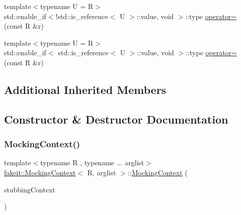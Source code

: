 \begin{DoxyCompactItemize}
\item 
{\footnotesize template$<$typename U  = R$>$ }\\std\+::enable\+\_\+if$<$!std\+::is\+\_\+reference$<$ U $>$\+::value, void $>$\+::type \mbox{\hyperlink{classfakeit_1_1MockingContext_adfac3df2408adaa86efec81bd5533a6d}{operator=}} (const R \&r)
\item 
{\footnotesize template$<$typename U  = R$>$ }\\std\+::enable\+\_\+if$<$ std\+::is\+\_\+reference$<$ U $>$\+::value, void $>$\+::type \mbox{\hyperlink{classfakeit_1_1MockingContext_ad5e903b223858dbe67f1da1523ef0d60}{operator=}} (const R \&r)
\end{DoxyCompactItemize}
\subsection*{Additional Inherited Members}


\subsection{Constructor \& Destructor Documentation}
\mbox{\label{classfakeit_1_1MockingContext_a5700542bcb10d5ff297e389f9ea988e8}} 
\subsubsection{\texorpdfstring{MockingContext()}{MockingContext()}\hspace{0.1cm}{\footnotesize\ttfamily [1/27]}}
{\footnotesize\ttfamily template$<$typename R , typename ... arglist$>$ \\
\mbox{\hyperlink{classfakeit_1_1MockingContext}{fakeit\+::\+Mocking\+Context}}$<$ R, arglist $>$\+::\mbox{\hyperlink{classfakeit_1_1MockingContext}{Mocking\+Context}} (\begin{DoxyParamCaption}\item[{typename \mbox{\hyperlink{classfakeit_1_1MethodMockingContext}{Method\+Mocking\+Context}}$<$ R, arglist... $>$\+::Context $\ast$}]{stubbing\+Context }\end{DoxyParamCaption})\hspace{0.3cm}{\ttfamily [inline]}}

